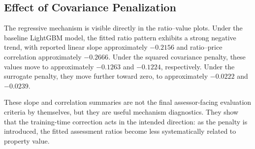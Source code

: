 \documentclass[12pt, draft]{article}
\theoremstyle{plain}
\theoremstyle{definition}
\newcommand{\1}{\mathbf{1}}
\begin{document}
{\subsection{Effect of Covariance Penalization}


The regressive mechanism is visible directly in the ratio--value plots. Under the baseline LightGBM model, the fitted ratio pattern exhibits a strong negative trend, with reported linear slope approximately \(-0.2156\) and ratio--price correlation approximately \(-0.2666\). Under the squared covariance penalty, these values move to approximately \(-0.1263\) and \(-0.1224\), respectively. Under the surrogate penalty, they move further toward zero, to approximately \(-0.0222\) and \(-0.0239\). 

These slope and correlation summaries are not the final assessor-facing evaluation criteria by themselves, but they are useful mechanism diagnostics. They show that the training-time correction acts in the intended direction: as the penalty is introduced, the fitted assessment ratios become less systematically related to property value.



}
\end{document}
